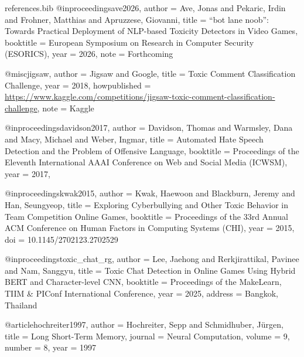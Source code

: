 \begin{filecontents*}{references.bib}
@inproceedings{ave2026,
  author = {Ave, Jonas and Pekaric, Irdin and Frohner, Matthias and Apruzzese, Giovanni},
  title = {{``bot lane noob'': Towards Practical Deployment of NLP-based Toxicity Detectors in Video Games}},
  booktitle = {European Symposium on Research in Computer Security (ESORICS)},
  year = {2026},
  note = {Forthcoming}
}

@misc{jigsaw,
  author = {{Jigsaw} and {Google}},
  title = {Toxic Comment Classification Challenge},
  year = {2018},
  howpublished = {\url{https://www.kaggle.com/competitions/jigsaw-toxic-comment-classification-challenge}},
  note = {Kaggle}
}

@inproceedings{davidson2017,
  author = {Davidson, Thomas and Warmsley, Dana and Macy, Michael and Weber, Ingmar},
  title = {Automated Hate Speech Detection and the Problem of Offensive Language},
  booktitle = {Proceedings of the Eleventh International AAAI Conference on Web and Social Media (ICWSM)},
  year = {2017},
}

@inproceedings{kwak2015,
  author = {Kwak, Haewoon and Blackburn, Jeremy and Han, Seungyeop},
  title = {Exploring Cyberbullying and Other Toxic Behavior in Team Competition Online Games},
  booktitle = {Proceedings of the 33rd Annual ACM Conference on Human Factors in Computing Systems (CHI)},
  year = {2015},
  doi = {10.1145/2702123.2702529}
}

@inproceedings{toxic_chat_rg,
  author = {Lee, Jaehong and Rerkjirattikal, Pavinee and Nam, Sanggyu},
  title = {Toxic Chat Detection in Online Games Using Hybrid {BERT} and Character-level {CNN}},
  booktitle = {Proceedings of the MakeLearn, TIIM \& PIConf International Conference},
  year = {2025},
  address = {Bangkok, Thailand}
}

@article{hochreiter1997,
  author = {Hochreiter, Sepp and Schmidhuber, J\"{u}rgen},
  title = {Long Short-Term Memory},
  journal = {Neural Computation},
  volume = {9},
  number = {8},
  year = {1997}
}
\end{filecontents*}

\documentclass[final]{article}

